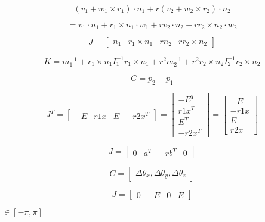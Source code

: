 \documentclass{article}
\begin{document}
\[(v_1 + w_1 \times r_1) \cdot n_1 + r (v_2 + w_2 \times r_2) \cdot n_2\]
\pagebreak

\[= v_1 \cdot n_1 + r_1 \times n_1 \cdot w_1 + r v_2 \cdot n_2 + r r_2 \times n_2 \cdot w_2\]
\pagebreak

\[J = \begin{bmatrix}n_1 & r_1 \times n_1 & r n_2 & r r_2 \times n_2\end{bmatrix}\]
\pagebreak

\[K = m_1^{-1} + r_1 \times n_1 I_1^{-1} r_1 \times n_1 + r^2 m_2^{-1} + r^2 r_2 \times n_2 I_2^{-1} r_2 \times n_2\]
\pagebreak

\[C = p_2 - p_1\]
\pagebreak

\[J^T = \begin{bmatrix}-E & r1x & E & -r2x^T\end{bmatrix}
= \begin{bmatrix}-E^T \\ r1x^T \\ E^T \\ -r2x^T\end{bmatrix}
= \begin{bmatrix}-E \\ -r1x \\ E \\ r2x\end{bmatrix}\]
\pagebreak

\[J = \begin{bmatrix}0 & a^T & -r b^T & 0\end{bmatrix}\]
\pagebreak

\[C = \begin{bmatrix}\Delta\theta_x, \Delta\theta_y, \Delta\theta_z\end{bmatrix}\]
\pagebreak

\[J = \begin{bmatrix}0 & -E & 0 & E\end{bmatrix}\]
\pagebreak

$\in [-\pi, \pi]$
\pagebreak
\end{document}

